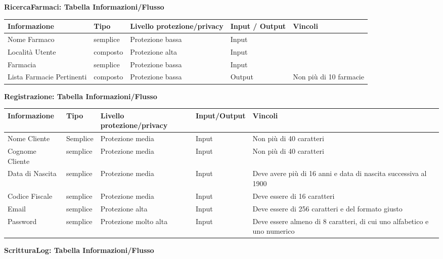 \textbf{RicercaFarmaci: Tabella Informazioni/Flusso}
\\

\begin{tabular} {|P{3cm}|P{3cm}|P{3cm}|P{3cm}|P{3cm}|}
    \hline
    \textbf{Informazione} & \textbf{Tipo} & \textbf{Livello protezione/privacy} & \textbf{Input / Output} & \textbf{Vincoli}\\
    \hline
    Nome Farmaco & semplice & Protezione bassa & Input & \\
    \hline
    Località Utente & composto & Protezione alta & Input & \\
    \hline
    Farmacia & semplice & Protezione bassa & Input & \\
    \hline
    Lista Farmacie Pertinenti & composto & Protezione bassa & Output & Non più di 10 farmacie \\
    \hline
\end{tabular}
\hfill \break

\newpage
\textbf{Registrazione: Tabella Informazioni/Flusso}
\hfill \break

\begin{tabular} {|P{3cm}|P{3cm}|P{3cm}|P{3cm}|P{3cm}|}
    \hline
    \textbf{Informazione} & \textbf{Tipo} & \textbf{Livello protezione/privacy} & \textbf{Input/Output} & \textbf{Vincoli} \\
    \hline
    Nome Cliente & Semplice & Protezione media & Input & Non più di 40 caratteri \\
    \hline
    Cognome Cliente & semplice & Protezione media & Input & Non più di 40 caratteri \\
    \hline
    Data di Nascita & semplice & Protezione media & Input & Deve avere più di 16 anni e data di nascita successiva al 1900 \\
    \hline
    Codice Fiscale & semplice & Protezione media & Input & Deve essere di 16 caratteri \\
    \hline
    Email &  semplice & Protezione alta & Input & Deve essere di 256 caratteri e del formato giusto \\
    \hline
    Password & semplice & Protezione molto alta & Input & Deve essere almeno di 8 caratteri, di cui uno alfabetico e uno numerico \\
    \hline
\end{tabular}
\hfill \break

\textbf{ScritturaLog: Tabella Informazioni/Flusso}
\hfill \break

